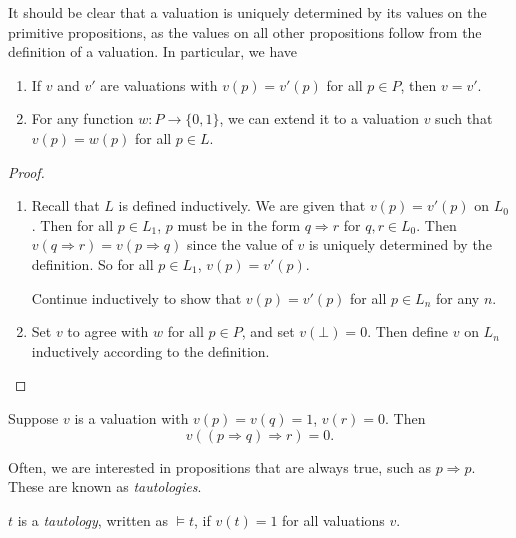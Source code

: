 \documentclass[a4paper]{article}
\begin{document}
It should be clear that a valuation is uniquely determined by its values on the primitive propositions, as the values on all other propositions follow from the definition of a valuation. In particular, we have
\begin{prop}\leavevmode
  \begin{enumerate}
    \item If $v$ and $v'$ are valuations with $v(p) = v'(p)$ for all $p\in P$, then $v = v'$.
    \item For any function $w: P \to \{0, 1\}$, we can extend it to a valuation $v$ such that $v(p) = w(p)$ for all $p\in L$.
  \end{enumerate}
\end{prop}

\begin{proof}\leavevmode
  \begin{enumerate}
    \item Recall that $L$ is defined inductively. We are given that $v(p) = v'(p)$ on $L_0$. Then for all $p\in L_1$, $p$ must be in the form $q\Rightarrow r$ for $q, r\in L_0$. Then $v(q\Rightarrow r) = v(p\Rightarrow q)$ since the value of $v$ is uniquely determined by the definition. So for all $p\in L_1$, $v(p) = v'(p)$.

      Continue inductively to show that $v(p) = v'(p)$ for all $p\in L_n$ for any $n$.

    \item Set $v$ to agree with $w$ for all $p\in P$, and set $v(\bot) = 0$. Then define $v$ on $L_n$ inductively according to the definition.
  \end{enumerate}
\end{proof}

\begin{eg}
  Suppose $v$ is a valuation with $v(p) = v(q) = 1$, $v(r) = 0$. Then
  \[
    v((p\Rightarrow q)\Rightarrow r) = 0.
  \]
\end{eg}

Often, we are interested in propositions that are always true, such as $p \Rightarrow p$. These are known as \emph{tautologies}.
\begin{defi}[Tautology]
  $t$ is a \emph{tautology}, written as $\models t$, if $v(t) = 1$ for all valuations $v$.
\end{defi}
\end{document}
